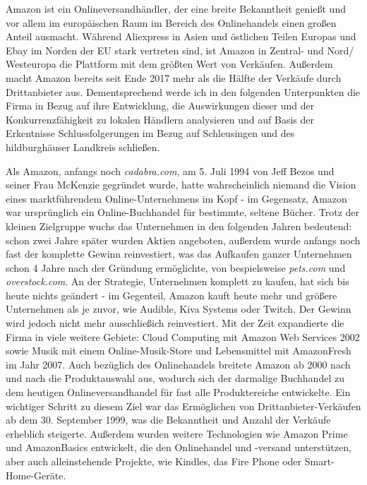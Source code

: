 Amazon ist ein Onlineversandhändler, der eine breite Bekanntheit genießt und vor allem im europäischen Raum im Bereich des Onlinehandels einen großen Anteil ausmacht. Während Aliexpress in Asien und östlichen Teilen Europas und Ebay im Norden der EU stark vertreten sind, ist Amazon in Zentral- und Nord/ Westeuropa die Plattform mit dem größten Wert von Verkäufen\cite[S. 22]{EuroCommerce}. Außerdem macht Amazon bereits seit Ende 2017 mehr als die Hälfte der Verkäufe durch Drittanbieter aus\cite[S. 25]{Haendlerbund}. Dementsprechend werde ich in den folgenden Unterpunkten die Firma in Bezug auf ihre Entwicklung, die Auswirkungen dieser und der Konkurrenzfähigkeit zu lokalen Händlern analysieren und auf Basis der Erkentnisse Schlussfolgerungen im Bezug auf Schleusingen und des hildburghäuser Landkreis schließen.

Als Amazon, anfangs noch \emph{cadabra.com}, am 5. Juli 1994 von Jeff Bezos und seiner Frau McKenzie gegründet wurde, hatte wahrscheinlich niemand die Vision eines marktführendem Online-Unternehmens im Kopf - im Gegensatz, Amazon war ursprünglich ein Online-Buchhandel für bestimmte, seltene Bücher\cite[S. 17]{Graf}. Trotz der kleinen Zielgruppe wuchs das Unternehmen in den folgenden Jahren bedeutend: schon zwei Jahre später wurden Aktien angeboten, außerdem wurde anfangs noch fast der komplette Gewinn reinvestiert\cite{Rosoff}, was das Aufkaufen ganzer Unternehmen schon 4 Jahre nach der Gründung ermöglichte, von bespielsweise \emph{pets.com} und \emph{overstock.com}\cite{ChannelAdvisor}. An der Strategie, Unternehmen komplett zu kaufen, hat sich bis heute nichts geändert - im Gegenteil, Amazon kauft heute mehr und größere Unternehmen als je zuvor\cite[S. 27]{Haendlerbund}, wie Audible, Kiva Systems oder Twitch\cite{Sherman}. Der Gewinn wird jedoch nicht mehr ausschließich reinvestiert\cite{Rosoff}. Mit der Zeit expandierte die Firma in viele weitere Gebiete: Cloud Computing mit Amazon Web Services 2002 sowie Musik mit einem Online-Musik-Store und Lebensmittel mit AmazonFresh im Jahr 2007\cite{Sherman, ChannelAdvisor}. Auch bezüglich des Onlinehandels breitete Amazon ab 2000 nach und nach die Produktauswahl aus, wodurch sich der darmalige Buchhandel zu dem heutigen Onlineversandhandel für fast alle Produktereiche entwickelte. Ein wichtiger Schritt zu diesem Ziel war das Ermöglichen von Drittanbieter-Verkäufen ab dem 30. September 1999, was die Bekanntheit und Anzahl der Verkäufe erheblich steigerte\cite{Sherman}. Außerdem wurden weitere Technologien wie Amazon Prime und AmazonBasics entwickelt, die den Onlinehandel und -versand unterstützen\cite{ChannelAdvisor}, aber auch alleinstehende Projekte, wie Kindles, das Fire Phone oder Smart-Home-Geräte\cite{Sherman}.

